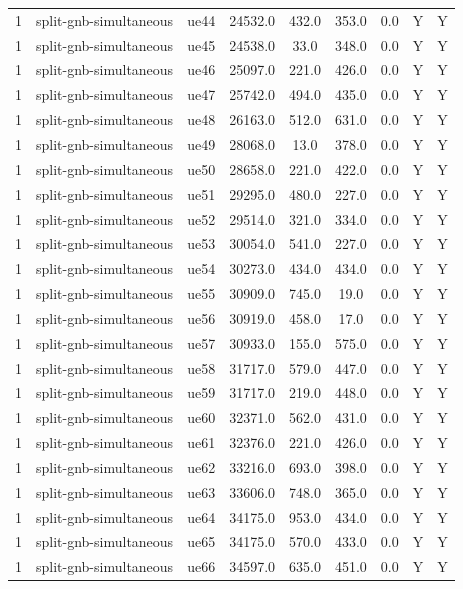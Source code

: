 \begin{table}[ht]
\begin{tabular}{|c|c|c|c|c|c|c|c|c|}
1 & split-gnb-simultaneous & ue44 & 24532.0 & 432.0 & 353.0 & 0.0 & Y & Y \\
1 & split-gnb-simultaneous & ue45 & 24538.0 & 33.0 & 348.0 & 0.0 & Y & Y \\
1 & split-gnb-simultaneous & ue46 & 25097.0 & 221.0 & 426.0 & 0.0 & Y & Y \\
1 & split-gnb-simultaneous & ue47 & 25742.0 & 494.0 & 435.0 & 0.0 & Y & Y \\
1 & split-gnb-simultaneous & ue48 & 26163.0 & 512.0 & 631.0 & 0.0 & Y & Y \\
1 & split-gnb-simultaneous & ue49 & 28068.0 & 13.0 & 378.0 & 0.0 & Y & Y \\
1 & split-gnb-simultaneous & ue50 & 28658.0 & 221.0 & 422.0 & 0.0 & Y & Y \\
1 & split-gnb-simultaneous & ue51 & 29295.0 & 480.0 & 227.0 & 0.0 & Y & Y \\
1 & split-gnb-simultaneous & ue52 & 29514.0 & 321.0 & 334.0 & 0.0 & Y & Y \\
1 & split-gnb-simultaneous & ue53 & 30054.0 & 541.0 & 227.0 & 0.0 & Y & Y \\
1 & split-gnb-simultaneous & ue54 & 30273.0 & 434.0 & 434.0 & 0.0 & Y & Y \\
1 & split-gnb-simultaneous & ue55 & 30909.0 & 745.0 & 19.0 & 0.0 & Y & Y \\
1 & split-gnb-simultaneous & ue56 & 30919.0 & 458.0 & 17.0 & 0.0 & Y & Y \\
1 & split-gnb-simultaneous & ue57 & 30933.0 & 155.0 & 575.0 & 0.0 & Y & Y \\
1 & split-gnb-simultaneous & ue58 & 31717.0 & 579.0 & 447.0 & 0.0 & Y & Y \\
1 & split-gnb-simultaneous & ue59 & 31717.0 & 219.0 & 448.0 & 0.0 & Y & Y \\
1 & split-gnb-simultaneous & ue60 & 32371.0 & 562.0 & 431.0 & 0.0 & Y & Y \\
1 & split-gnb-simultaneous & ue61 & 32376.0 & 221.0 & 426.0 & 0.0 & Y & Y \\
1 & split-gnb-simultaneous & ue62 & 33216.0 & 693.0 & 398.0 & 0.0 & Y & Y \\
1 & split-gnb-simultaneous & ue63 & 33606.0 & 748.0 & 365.0 & 0.0 & Y & Y \\
1 & split-gnb-simultaneous & ue64 & 34175.0 & 953.0 & 434.0 & 0.0 & Y & Y \\
1 & split-gnb-simultaneous & ue65 & 34175.0 & 570.0 & 433.0 & 0.0 & Y & Y \\
1 & split-gnb-simultaneous & ue66 & 34597.0 & 635.0 & 451.0 & 0.0 & Y & Y \\

\end{tabular}
\end{table}
